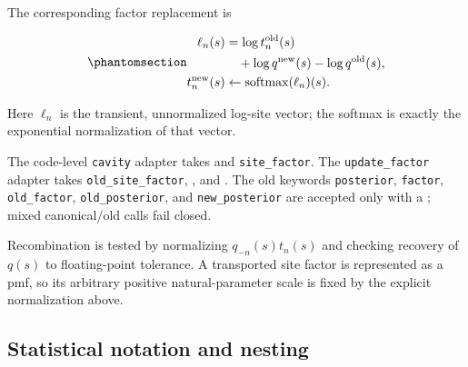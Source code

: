 \documentclass[
  english,
]{article}
\theoremstyle{plain}
\theoremstyle{definition}
\theoremstyle{remark}
\theoremstyle{definition}
\begin{document}
The corresponding factor replacement is

\begin{equation}\protect\phantomsection\label{eq:notation-factor-replacement}{\begin{aligned}
\ell_n(s)
&= \log t_n^{\mathrm{old}}(s)\\
&\quad +\log q^{\mathrm{new}}(s)-\log q^{\mathrm{old}}(s),\\
t_n^{\mathrm{new}}(s)
&\leftarrow \operatorname{softmax}(\ell_n)(s).
\end{aligned}}\end{equation}

Here \(\ell_n\) is the transient, unnormalized log-site vector; the
softmax is exactly the exponential normalization of that vector.

The code-level \texttt{cavity} adapter takes 
and \texttt{site\_factor}. The \texttt{update\_factor} adapter takes
\texttt{old\_site\_factor}, , and
. The old keywords \texttt{posterior},
\texttt{factor}, \texttt{old\_factor}, \texttt{old\_posterior}, and
\texttt{new\_posterior} are accepted only with a
; mixed canonical/old calls fail closed.

Recombination is tested by normalizing \(q_{-n}(s)t_n(s)\) and checking
recovery of \(q(s)\) to floating-point tolerance. A transported site
factor is represented as a pmf, so its arbitrary positive
natural-parameter scale is fixed by the explicit normalization above.

\subsection{Statistical notation and
nesting}\label{statistical-notation-and-nesting}
\end{document}
